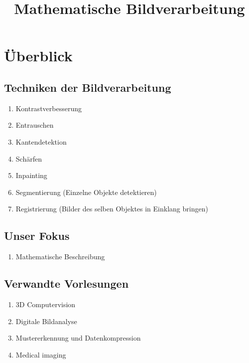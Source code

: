 \documentclass[ngerman]{article}
\theoremstyle{plain}
\theoremstyle{definition}
\numberwithin{equation}{section}
\begin{document}
\title{Mathematische Bildverarbeitung}
\date{}
\maketitle

\tableofcontents

\newpage

\section{Überblick}
    \subsection{Techniken der Bildverarbeitung}
        \begin{enumerate}[label=\textbullet]
            \item Kontrastverbesserung
            \item Entrauschen
            \item Kantendetektion
            \item Schärfen
            \item Inpainting
            \item Segmentierung (Einzelne Objekte detektieren)
            \item Registrierung (Bilder des selben Objektes in Einklang bringen)
        \end{enumerate}

    \subsection{Unser Fokus}
        \begin{enumerate}[label=\textbullet]
            \item Mathematische Beschreibung
        \end{enumerate}

    \subsection{Verwandte Vorlesungen}
        \begin{enumerate}[label=\textbullet]
            \item 3D Computervision
            \item Digitale Bildanalyse
            \item Mustererkennung und Datenkompression
            \item Medical imaging
        \end{enumerate}
\end{document}
